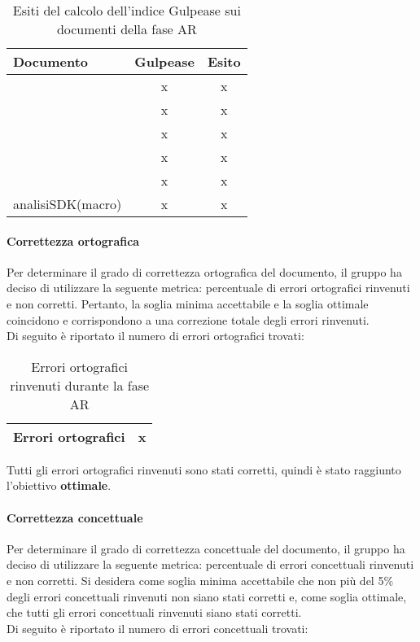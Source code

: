 \documentclass[PianoDiQualifica.tex]{subfiles}
\begin{document}
				\begin{table}[h]
				\centering
				\begin{tabular}{l c c}
					\hline
					\rule[-0.3cm]{0cm}{0.8cm}
					\textbf{Documento} & \textbf{Gulpease} & \textbf{Esito} \\
					\hline
					\rule[0cm]{0cm}{0.4cm}
					\PPdocRR & x & x \\
					\rule[0cm]{0cm}{0.4cm}
					\NPdocRR & x & x \\ 
					\rule[0cm]{0cm}{0.4cm}
					\ARdocRR & x & x \\ 
					\rule[0cm]{0cm}{0.4cm}
					\PQdocRR & x & x \\ 
					\rule[0cm]{0cm}{0.4cm}
					\Gldoc & x & x \\ 
					\rule[0cm]{0cm}{0.4cm}
					analisiSDK(macro) & x & x \\ 
					\hline
				\end{tabular}
				\caption{Esiti del calcolo dell'indice Gulpease sui documenti della fase AR}
			\end{table}		
		\paragraph{Correttezza ortografica}
		Per determinare il grado di correttezza ortografica del documento, il gruppo ha deciso di utilizzare la seguente metrica: percentuale di errori ortografici rinvenuti e non corretti.
				Pertanto, la soglia minima accettabile e la soglia ottimale coincidono e corrispondono a una correzione totale degli errori rinvenuti.\\
				Di seguito è riportato il numero di errori ortografici trovati:\\
				
				\begin{table}[h]
				\centering
				\begin{tabular}{l c}
					\hline
					\rule[0cm]{0cm}{0.4cm}
					Errori ortografici & x \\
					\hline
				\end{tabular}
				\caption{Errori ortografici rinvenuti durante la fase AR}
			\end{table}		
			
			Tutti gli errori ortografici rinvenuti sono stati corretti, quindi è stato
raggiunto l’obiettivo \textbf{ottimale}.
				
				
		\paragraph{Correttezza concettuale}
		Per determinare il grado di correttezza concettuale del documento, il gruppo ha deciso di utilizzare la seguente metrica: percentuale di errori concettuali rinvenuti e non corretti.
				Si desidera come soglia minima accettabile che non più del 5\% degli errori concettuali rinvenuti non siano stati corretti e, come soglia ottimale, che tutti gli errori
				concettuali rinvenuti siano stati corretti.\\
				Di seguito è riportato il numero di errori concettuali trovati:\\
				
\end{document}
